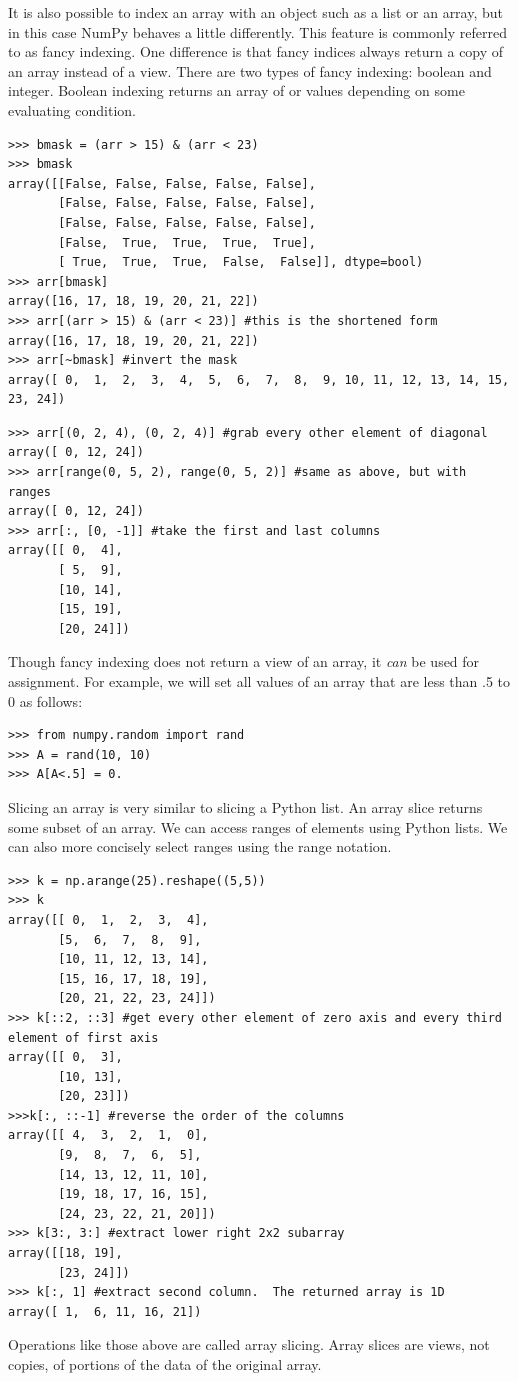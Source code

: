 It is also possible to index an array with an object such as a list or an array, but in this case NumPy behaves a little differently.
This feature is commonly referred to as fancy indexing.
One difference is that fancy indices always return a copy of an array instead of a view.
There are two types of fancy indexing: boolean and integer.
Boolean indexing returns an array of  or  values depending on some 
evaluating condition.
\begin{lstlisting}
>>> bmask = (arr > 15) & (arr < 23)
>>> bmask
array([[False, False, False, False, False],
       [False, False, False, False, False],
       [False, False, False, False, False],
       [False,  True,  True,  True,  True],
       [ True,  True,  True,  False,  False]], dtype=bool)
>>> arr[bmask]
array([16, 17, 18, 19, 20, 21, 22])
>>> arr[(arr > 15) & (arr < 23)] #this is the shortened form
array([16, 17, 18, 19, 20, 21, 22])
>>> arr[~bmask] #invert the mask
array([ 0,  1,  2,  3,  4,  5,  6,  7,  8,  9, 10, 11, 12, 13, 14, 15, 23, 24])
\end{lstlisting}
\begin{lstlisting}
>>> arr[(0, 2, 4), (0, 2, 4)] #grab every other element of diagonal
array([ 0, 12, 24])
>>> arr[range(0, 5, 2), range(0, 5, 2)] #same as above, but with ranges
array([ 0, 12, 24])
>>> arr[:, [0, -1]] #take the first and last columns
array([[ 0,  4],
       [ 5,  9],
       [10, 14],
       [15, 19],
       [20, 24]])
\end{lstlisting}

Though fancy indexing does not return a view of an array, it \emph{can} be used for assignment.
For example, we will set all values of an array that are less than .5 to 0 as follows:
\begin{lstlisting}
>>> from numpy.random import rand
>>> A = rand(10, 10)
>>> A[A<.5] = 0.
\end{lstlisting}

Slicing an array is very similar to slicing a Python list.
An array slice returns some subset of an array.
We can access ranges of elements using Python lists.
We can also more concisely select ranges using the  range notation.
\begin{lstlisting}
>>> k = np.arange(25).reshape((5,5))
>>> k
array([[ 0,  1,  2,  3,  4],
       [5,  6,  7,  8,  9],
       [10, 11, 12, 13, 14],
       [15, 16, 17, 18, 19],
       [20, 21, 22, 23, 24]])
>>> k[::2, ::3] #get every other element of zero axis and every third element of first axis
array([[ 0,  3],
       [10, 13],
       [20, 23]])
>>>k[:, ::-1] #reverse the order of the columns
array([[ 4,  3,  2,  1,  0],
       [9,  8,  7,  6,  5],
       [14, 13, 12, 11, 10],
       [19, 18, 17, 16, 15],
       [24, 23, 22, 21, 20]])
>>> k[3:, 3:] #extract lower right 2x2 subarray
array([[18, 19],
       [23, 24]])
>>> k[:, 1] #extract second column.  The returned array is 1D
array([ 1,  6, 11, 16, 21])
\end{lstlisting}
Operations like those above are called array slicing.
Array slices are views, not copies, of portions of the data of the original array.

